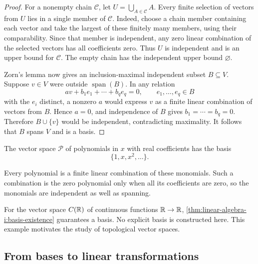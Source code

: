 \begin{pendingreview}
\begin{proof}
  For a nonempty chain \(\mathcal C\), let
  \(U=\bigcup_{A\in\mathcal C}A\). Every finite selection of vectors
  from \(U\) lies in a single member of \(\mathcal C\). Indeed, choose
  a chain member containing each vector and take the largest of these
  finitely many members, using their comparability. Since that member is
  independent, any zero linear combination of the selected vectors has
  all coefficients zero. Thus \(U\) is independent and is an upper bound
  for \(\mathcal C\). The empty chain has the independent upper bound
  \(\varnothing\).

  Zorn's lemma now gives an inclusion-maximal independent subset
  \(B\subseteq V\). Suppose \(v\in V\) were outside
  \(\operatorname{span}(B)\). In any relation
  \[
    av+b_1e_1+\cdots+b_qe_q=0,
    \qquad e_1,\ldots,e_q\in B
  \]
  with the \(e_i\) distinct, a nonzero \(a\) would express \(v\) as a
  finite linear combination of vectors from \(B\). Hence \(a=0\), and
  independence of \(B\) gives \(b_1=\cdots=b_q=0\). Therefore
  \(B\cup\{v\}\) would be independent, contradicting maximality.
  It follows that \(B\) spans \(V\) and is a basis.
\end{proof}
\end{pendingreview}

\begin{example}
  The vector space \(\mathcal P\) of polynomials in \(x\) with real
  coefficients has the basis
  \[
    \{1,x,x^2,\ldots\}.
  \]
  \begin{pendingreview}
  Every polynomial is a finite linear combination of these monomials.
  Such a combination is the zero polynomial only when all its coefficients
  are zero, so the monomials are independent as well as spanning.
  \end{pendingreview}
\end{example}

For the vector space \(C(\mathbb{R})\) of continuous functions \(\mathbb{R}\to\mathbb{R}\),
\autoref{thm:linear-algebra-i:basis-existence} guarantees a basis. No explicit
basis is constructed here. This example motivates the study of topological
vector spaces.

\subsection{From bases to linear transformations}
\label{sec:linear-algebra-i:bases-to-transformations}

